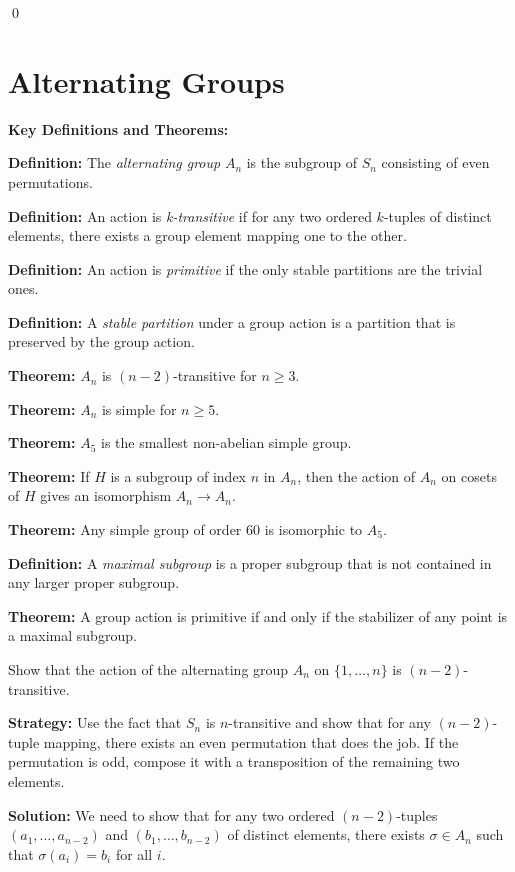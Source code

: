 \qed
\section{Alternating Groups}

\textbf{Key Definitions and Theorems:}

\textbf{Definition:} The \textit{alternating group} $A_n$ is the subgroup of $S_n$ consisting of even permutations.

\textbf{Definition:} An action is \textit{k-transitive} if for any two ordered $k$-tuples of distinct elements, there exists a group element mapping one to the other.

\textbf{Definition:} An action is \textit{primitive} if the only stable partitions are the trivial ones.

\textbf{Definition:} A \textit{stable partition} under a group action is a partition that is preserved by the group action.

\textbf{Theorem:} $A_n$ is $(n-2)$-transitive for $n \geq 3$.

\textbf{Theorem:} $A_n$ is simple for $n \geq 5$.

\textbf{Theorem:} $A_5$ is the smallest non-abelian simple group.

\textbf{Theorem:} If $H$ is a subgroup of index $n$ in $A_n$, then the action of $A_n$ on cosets of $H$ gives an isomorphism $A_n \to A_n$.

\textbf{Theorem:} Any simple group of order 60 is isomorphic to $A_5$.

\textbf{Definition:} A \textit{maximal subgroup} is a proper subgroup that is not contained in any larger proper subgroup.

\textbf{Theorem:} A group action is primitive if and only if the stabilizer of any point is a maximal subgroup.

\begin{problembox}
Show that the action of the alternating group $A_n$ on $\{1, \ldots, n\}$ is $(n - 2)$-transitive.
\end{problembox}

\noindent\textbf{Strategy:} Use the fact that $S_n$ is $n$-transitive and show that for any $(n-2)$-tuple mapping, there exists an even permutation that does the job. If the permutation is odd, compose it with a transposition of the remaining two elements.

\noindent\textbf{Solution:} We need to show that for any two ordered $(n-2)$-tuples $(a_1, \ldots, a_{n-2})$ and $(b_1, \ldots, b_{n-2})$ of distinct elements, there exists $\sigma \in A_n$ such that $\sigma(a_i) = b_i$ for all $i$.

